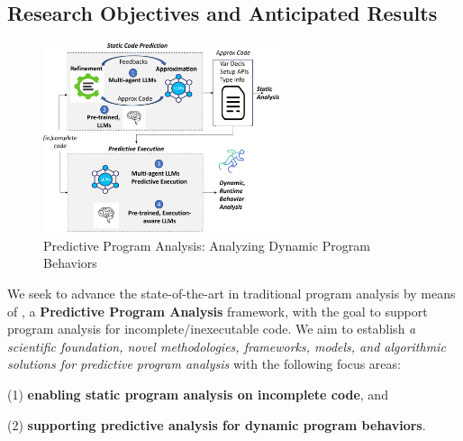 \subsection{Research Objectives and Anticipated Results}

\begin{figure}
    \centering
    \includegraphics[width=0.62\textwidth]{overview-new.png}
    \vspace{-10pt}
    \caption{Predictive Program Analysis: Analyzing Dynamic Program Behaviors}
    \label{fig:arch}
\end{figure}


We seek to advance the state-of-the-art in
traditional program analysis by means of {\tool}, a {\bf Predictive Program
Analysis} framework, with the goal to support program analysis for
incomplete/inexecutable code. We aim to establish {\em a scientific
  foundation, novel methodologies, frameworks, models, and algorithmic
  solutions for predictive program analysis} with the following focus
areas:



(1) {\bf enabling static program analysis on incomplete code}, and

(2) {\bf supporting predictive analysis for dynamic program behaviors}.


